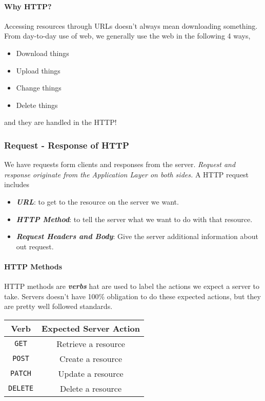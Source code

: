 \documentclass[10pt]{article}
\begin{document}
\paragraph{Why HTTP?} Accessing resources through URLs doesn't always mean downloading something. From day-to-day use of web, we generally use the web in the following 4 ways,
\begin{itemize}
    \item Download things
    \item Upload things
    \item Change things
    \item Delete things
\end{itemize}
and they are handled in the HTTP!

\subsubsection{Request - Response of HTTP}
We have requests form clients and responses from the server. \textit{Request and response originate from the Application Layer on both sides.} A HTTP request includes
\begin{itemize}
    \item \textbf{\textit{URL}}: to get to the resource on the server we want.
    \item \textit{\textbf{HTTP Method}}: to tell the server what we want to do with that resource.
    \item \textbf{\textit{Request Headers and Body}}: Give the server additional information about out request. 
\end{itemize}

\paragraph{HTTP Methods}
HTTP methods are \textit{\textbf{verbs}} hat are used to label the actions we expect a server to take. \color{Red} Servers doesn't have 100\% obligation to do these expected actions, but they are pretty well followed standards. \color{Black}
\begin{center}
    \begin{tabular}{|c|c|}
        \hline
        Verb            & Expected Server Action \\ \hline
        \texttt{GET}    & Retrieve a resource    \\ \hline
        \texttt{POST}   & Create a resource      \\ \hline
        \texttt{PATCH}  & Update a resource      \\ \hline
        \texttt{DELETE} & Delete a resource      \\ \hline
    \end{tabular}
\end{center}
\end{document}
